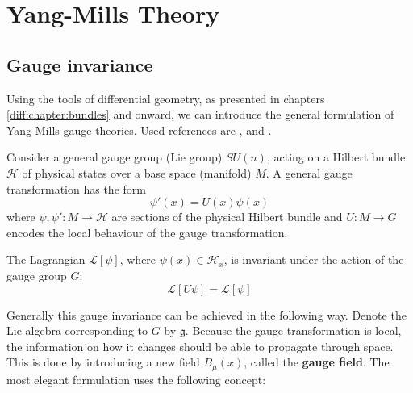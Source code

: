 \chapter{Yang-Mills Theory}

\section{Gauge invariance}

	Using the tools of differential geometry, as presented in chapters \ref{diff:chapter:bundles} and onward, we can introduce the general formulation of Yang-Mills gauge theories. Used references are \cite{principal_bundles}, \cite{sen_nash} and \cite{schuller}.

	Consider a general gauge group (Lie group) $SU(n)$, acting on a Hilbert bundle $\mathcal{H}$ of physical states over a base space (manifold) $M$. A general gauge transformation has the form
	\begin{equation}
		\label{qft:gauge_transformation}
		\psi'(x) = U(x)\psi(x)
	\end{equation}
	where $\psi, \psi':M\rightarrow\mathcal{H}$ are sections of the physical Hilbert bundle and $U:M\rightarrow G$ encodes the local behaviour of the gauge transformation.
	
	\begin{theorem}
		The Lagrangian $\mathcal{L}[\psi]$, where $\psi(x)\in\mathcal{H}_x$, is invariant under the action of the gauge group $G$:
		\begin{equation}
			\mathcal{L}[U\psi] = \mathcal{L}[\psi]
		\end{equation}
	\end{theorem}
	
	Generally this gauge invariance can be achieved in the following way. Denote the Lie algebra corresponding to $G$ by $\mathfrak{g}$. Because the gauge transformation is local, the information on how it changes should be able to propagate through space. This is done by introducing a new field $B_\mu(x)$, called the \textbf{gauge field}. The most elegant formulation uses the following concept:
	
